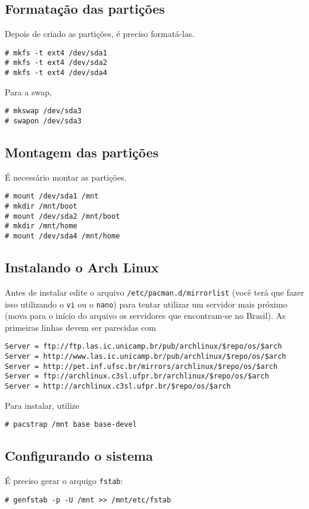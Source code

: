 \documentclass[A4paper]{article}
\begin{document}
\subsection{Formatação das partições}
Depois de criado as partições, é preciso formatá-las.
\begin{lstlisting}
# mkfs -t ext4 /dev/sda1
# mkfs -t ext4 /dev/sda2
# mkfs -t ext4 /dev/sda4
\end{lstlisting}

Para a swap,
\begin{lstlisting}
# mkswap /dev/sda3
# swapon /dev/sda3
\end{lstlisting}

\subsection{Montagem das partições}
É necessário montar as partições.
\begin{lstlisting}
# mount /dev/sda1 /mnt
# mkdir /mnt/boot
# mount /dev/sda2 /mnt/boot
# mkdir /mnt/home
# mount /dev/sda4 /mnt/home
\end{lstlisting}

\subsection{Instalando o Arch Linux}
Antes de instalar edite o arquivo \lstinline+/etc/pacman.d/mirrorlist+ (você
terá que fazer isso utilizando o \lstinline+vi+ ou o \lstinline+nano+) para
tentar utilizar um servidor mais próximo (mova para o início do arquivo os
servidores que encontram-se no Brasil). As primeiras linhas devem ser parecidas
com
\begin{lstlisting}
Server = ftp://ftp.las.ic.unicamp.br/pub/archlinux/$repo/os/$arch
Server = http://www.las.ic.unicamp.br/pub/archlinux/$repo/os/$arch
Server = http://pet.inf.ufsc.br/mirrors/archlinux/$repo/os/$arch
Server = ftp://archlinux.c3sl.ufpr.br/archlinux/$repo/os/$arch
Server = http://archlinux.c3sl.ufpr.br/$repo/os/$arch
\end{lstlisting}

Para instalar, utilize
\begin{lstlisting}
# pacstrap /mnt base base-devel
\end{lstlisting}

\subsection{Configurando o sistema}
É preciso gerar o arquigo \lstinline+fstab+:
\begin{lstlisting}
# genfstab -p -U /mnt >> /mnt/etc/fstab
\end{lstlisting}
\end{document}
